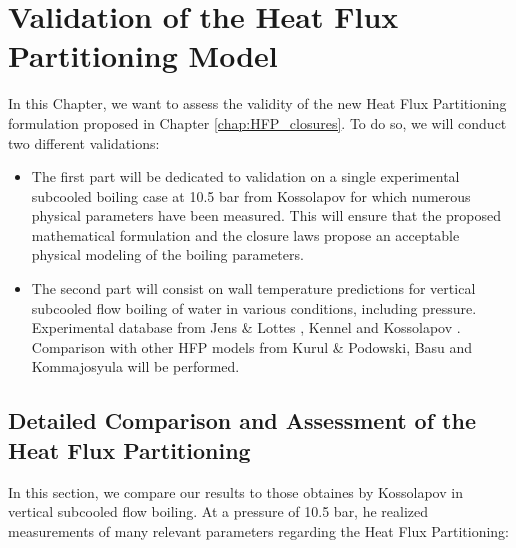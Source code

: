 
\chapter{Validation of the Heat Flux Partitioning Model} %

\label{ch:HFP_validation} %


In this Chapter, we want to assess the validity of the new Heat Flux Partitioning formulation proposed in Chapter \ref{chap:HFP_closures}. To do so, we will conduct two different validations:

\begin{itemize}
\setlength{\itemsep}{8pt}
\item The first part will be dedicated to validation on a single experimental subcooled boiling case at 10.5 bar from Kossolapov \cite{kossolapov_experimental_2021} for which numerous physical parameters have been measured. This will ensure that the proposed mathematical formulation and the closure laws propose an acceptable physical modeling of the boiling parameters.

\item The second part will consist on wall temperature predictions for vertical subcooled flow boiling of water in various conditions, including pressure. Experimental database from Jens \& Lottes \cite{jens_analysis_1951}, Kennel \cite{kennel_local_1949} and Kossolapov \cite{kossolapov_experimental_2021}. Comparison with other HFP models from Kurul \& Podowski, Basu and Kommajosyula will be performed.
\end{itemize}


\section{Detailed Comparison and Assessment of the Heat Flux Partitioning}

In this section, we compare our results to those obtaines by Kossolapov \cite{kossolapov_experimental_2021} in vertical subcooled flow boiling. At a pressure of 10.5 bar, he realized measurements of many relevant parameters regarding the Heat Flux Partitioning:

